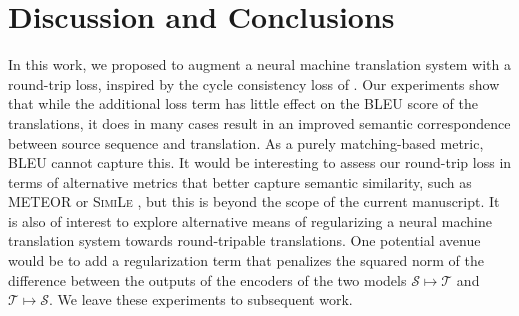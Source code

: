 \documentclass[10pt,a4paper]{article}
\begin{document}
\section{Discussion and Conclusions}\label{sec:discussion}
In this work, we proposed to augment a neural machine translation system with a round-trip loss, inspired by the cycle consistency loss of \citet{CycleGAN2017}. Our experiments show that while the additional loss term has little effect on the BLEU score of the translations, it does in many cases result in an improved semantic correspondence between source sequence and translation. As a purely matching-based metric, BLEU cannot capture this. It would be interesting to assess our round-trip loss in terms of alternative metrics that better capture semantic similarity, such as METEOR \citep{denkowski} or \textsc{SimiLe} \citep{wieting}, but this is beyond the scope of the current manuscript.
It is also of interest to explore alternative means of regularizing a neural machine translation system towards round-tripable translations. One potential avenue would be to add a regularization term that penalizes the squared norm of the difference between the outputs of the encoders of the two models $\mathcal{S}\mapsto\mathcal{T}$ and $\mathcal{T}\mapsto\mathcal{S}$. We leave these experiments to subsequent work.

\newpage

\end{document}
